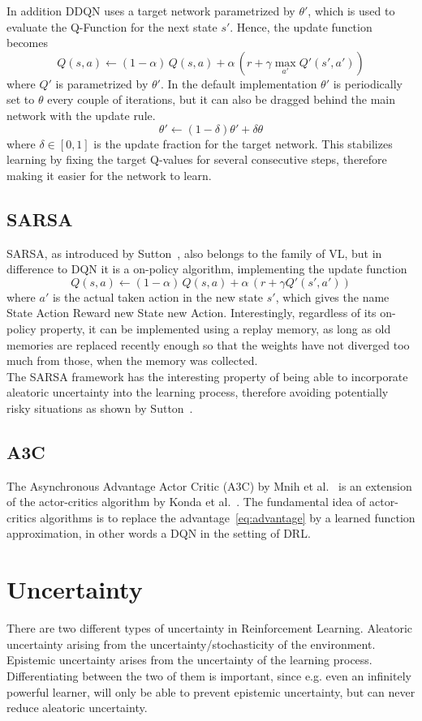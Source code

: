 \documentclass[11pt,a4paper]{article}
\begin{document}
	In addition DDQN uses a target network parametrized by $\theta'$, which is used to evaluate the Q-Function for the next state $s'$.
	Hence, the update function becomes
	\[Q(s,a) \leftarrow (1-\alpha)\, Q(s,a) + \alpha\,(r + \gamma \max_{a'}Q'(s', a'))\]
	where $Q'$ is parametrized by $\theta'$.
	In the default implementation $\theta'$ is periodically set to $\theta$ every couple of iterations, but it can also be dragged behind the main network with the update rule.
	\[\theta' \leftarrow (1 - \delta) \theta' + \delta \theta\]
	where $\delta \in [0,1]$ is the update fraction for the target network.
	This stabilizes learning by fixing the target Q-values for several consecutive steps, therefore making it easier for the network to learn.

	\subsection{SARSA}\label{subsec:sarsa}
	SARSA, as introduced by Sutton~\cite{sutton_introduction_1998}, also belongs to the family of VL, but in difference to DQN it is a on-policy algorithm, implementing the update function
	\[Q(s,a) \leftarrow (1-\alpha)\, Q(s,a) + \alpha\,(r + \gamma Q'(s', a'))\]
	where $a'$ is the actual taken action in the new state $s'$, which gives the name State Action Reward new State new Action.
	Interestingly, regardless of its on-policy property, it can be implemented using a replay memory, as long as  old memories are replaced recently enough so that the weights have not diverged too much from those, when the memory was collected.\\
	The SARSA framework has the interesting property of being able to incorporate aleatoric uncertainty into the learning process, therefore avoiding potentially risky situations as shown by Sutton~\cite{sutton_introduction_1998}.

	\subsection{A3C}\label{subsec:a3c}
	The Asynchronous Advantage Actor Critic (A3C) by Mnih et al.~\cite{mnih_asynchronous_2016} is an extension of the actor-critics algorithm by Konda et al.~\cite{konda_actor-critic_2000}.
	The fundamental idea of actor-critics algorithms is to replace the advantage~\ref{eq:advantage} by a learned function approximation, in other words a DQN in the setting of DRL.

	\section{Uncertainty}\label{sec:uncertainty}
	There are two different types of uncertainty in Reinforcement Learning.
	Aleatoric uncertainty arising from the uncertainty/stochasticity of the environment.
	Epistemic uncertainty arises from the uncertainty of the learning process.
	Differentiating between the two of them is important, since e.g. even an infinitely powerful learner, will only be able to prevent epistemic uncertainty, but can never reduce aleatoric uncertainty.
\end{document}
